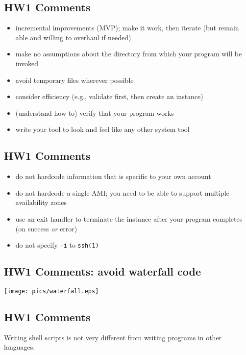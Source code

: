 \documentclass[xga]{xdvislides}
\begin{document}
\subsection{HW1 Comments}

\begin{itemize}
	\item incremental improvements (MVP); make it
		work, then iterate (but remain able and willing to
		overhaul if needed)
	\item make no assumptions about the directory
		from which your program will be invoked
	\item avoid temporary files wherever possible
	\item consider efficiency (e.g., validate first, then create an instance)
	\item (understand how to) verify that your program works
	\item write your tool to look and feel like any other system tool
\end{itemize}

\subsection{HW1 Comments}
\begin{itemize}
	\item do not hardcode information that is specific to your own account
	\item do not hardcode a single AMI; you need
		to be able to support multiple availability zones
	\item use an exit handler to terminate the instance after your
		program completes (on success {\em or} error)
	\item do not specify {\tt -i} to {\tt ssh(1)}
\end{itemize}

\subsection{HW1 Comments: avoid waterfall code}
\begin{center}
	\texttt{[image: pics/waterfall.eps]} \\
\end{center}

\subsection{HW1 Comments}
Writing shell scripts is not very different from
writing programs in other languages.
\end{document}

